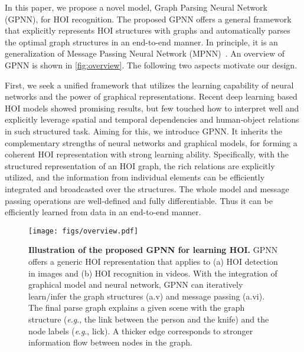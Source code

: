 \documentclass[runningheads]{llncs}
\newcommand{\eg}{\textit{e}.\textit{g}.}
\begin{document}
In this paper, we propose a novel model, Graph Parsing Neural Network (GPNN), for HOI recognition. The proposed GPNN offers a general framework that explicitly represents HOI structures with graphs and automatically parses the optimal graph structures in an end-to-end manner. In principle, it is an generalization of Message Passing Neural Network (MPNN)~\cite{gilmer2017neural}. An overview of GPNN is shown in \autoref{fig:overview}. The following two aspects motivate our design.

First, we seek a unified framework that utilizes the learning capability of neural networks and the power of graphical representations. Recent deep learning based HOI models showed promising results, but few touched how to interpret well and explicitly leverage spatial and temporal dependencies and human-object relations in such structured task. Aiming for this, we introduce GPNN. It inherits the complementary strengths of neural networks and graphical models, for forming a coherent HOI representation with strong learning ability. Specifically, with the structured representation of an HOI graph, the rich relations are explicitly utilized, and the information from individual elements can be efficiently integrated and broadcasted over the structures. The whole model and message passing operations are well-defined and fully differentiable. Thus it can be efficiently learned from data in an end-to-end manner.

\begin{figure}[t]
\centering
\texttt{[image: figs/overview.pdf]}
\caption{\textbf{Illustration of the proposed GPNN for learning HOI.} GPNN offers a generic HOI representation that applies to (a) HOI detection in images and (b) HOI recognition in videos. With the integration of graphical model and neural network, GPNN can iteratively learn/infer the graph structures (a.v) and message passing (a.vi). The final parse graph explains a given scene with the graph structure (\eg, the link between the person and the knife) and the node labels (\eg, lick). A thicker edge corresponds to stronger information flow between nodes in the graph.}
\label{fig:overview}
\end{figure}
\end{document}
